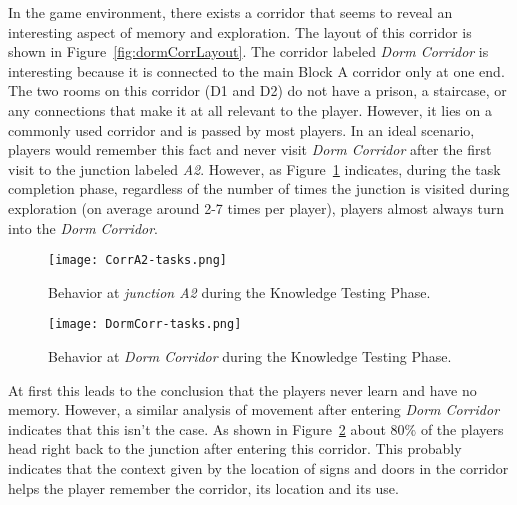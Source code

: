 In the game environment, there exists a corridor that seems to reveal an interesting aspect of memory and exploration. The layout of this corridor is shown in Figure~\ref{fig:dormCorrLayout}. The corridor labeled \emph{Dorm Corridor} is interesting because it is connected to the main Block A corridor only at one end. The two rooms on this corridor (D1 and D2) do not have a prison, a staircase, or any connections that make it at all relevant to the player. However, it lies on a commonly used corridor and is passed by most players. In an ideal scenario, players would remember this fact and never visit \emph{Dorm Corridor} after the first visit to the junction labeled \emph{A2}. However, as Figure~\ref{fig:junctionA2Behavior} indicates, during the task completion phase, regardless of the number of times the junction is visited during exploration (on average around 2-7 times per player), players almost always turn into the \emph{Dorm Corridor}.

\begin{figure}[tb]
    \begin{center}
        \texttt{[image: CorrA2-tasks.png]}
    \end{center}
    \caption{Behavior at \emph{junction A2} during the Knowledge Testing Phase.}
    \label{fig:junctionA2Behavior}
\end{figure}
\begin{figure}[tb]
    \begin{center}
        \texttt{[image: DormCorr-tasks.png]}
    \end{center}
    \caption{Behavior at \emph{Dorm Corridor} during  the Knowledge Testing Phase.}
    \label{fig:dormCorrBehavior}
\end{figure}

At first this leads to the conclusion that the players never learn and have no memory. However, a similar analysis of movement after entering \emph{Dorm Corridor} indicates that this isn't the case. As shown in Figure~\ref{fig:dormCorrBehavior} about $80\%$ of the players head right back to the junction after entering this corridor. This probably indicates that the context given by the location of signs and doors in the corridor helps the player remember the corridor, its location and its use.






